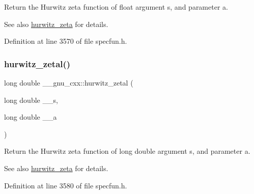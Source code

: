 Return the Hurwitz zeta function of {\ttfamily float} argument {\ttfamily s}, and parameter {\ttfamily a}.

\begin{DoxySeeAlso}{See also}
\hyperlink{group__mathsf__gnu_ga7b167ce1c8d9aa6aad40fc83a95733bd}{hurwitz\+\_\+zeta} for details. 
\end{DoxySeeAlso}


Definition at line 3570 of file specfun.\+h.

\mbox{\label{group__mathsf__gnu_gad8f2cfc7e198755968bae35d46b49d5a}} 
\subsubsection{\texorpdfstring{hurwitz\+\_\+zetal()}{hurwitz\_zetal()}}
{\footnotesize\ttfamily long double \+\_\+\+\_\+gnu\+\_\+cxx\+::hurwitz\+\_\+zetal (\begin{DoxyParamCaption}\item[{long double}]{\+\_\+\+\_\+s,  }\item[{long double}]{\+\_\+\+\_\+a }\end{DoxyParamCaption})\hspace{0.3cm}{\ttfamily [inline]}}

Return the Hurwitz zeta function of {\ttfamily long double} argument {\ttfamily s}, and parameter {\ttfamily a}.

\begin{DoxySeeAlso}{See also}
\hyperlink{group__mathsf__gnu_ga7b167ce1c8d9aa6aad40fc83a95733bd}{hurwitz\+\_\+zeta} for details. 
\end{DoxySeeAlso}


Definition at line 3580 of file specfun.\+h.

\mbox{\label{group__mathsf__gnu_ga374198e4076f9e23f3878ca3af70e6da}} 
